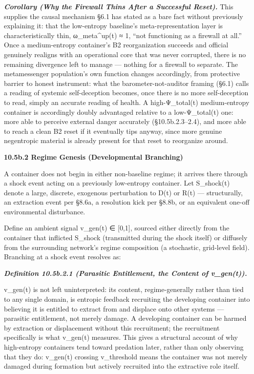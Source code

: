 \documentclass[
]{article}
\begin{document}
\emph{\textbf{Corollary (Why the Firewall Thins After a Successful
Reset).}} This supplies the causal mechanism §6.1 has stated as a bare
fact without previously explaining it: that the low-entropy baseline's
meta-representation layer is characteristically thin, ω\_meta\^{}up(t) ≈
1, ``not functioning as a firewall at all.'' Once a medium-entropy
container's B2 reorganization succeeds and official genuinely realigns
with an operational core that was never corrupted, there is no remaining
divergence left to manage --- nothing for a firewall to separate. The
metamessenger population's own function changes accordingly, from
protective barrier to honest instrument: what the barometer-not-auditor
framing (§6.1) calls a reading of systemic self-deception becomes, once
there is no more self-deception to read, simply an accurate reading of
health. A high-Ψ\_total(t) medium-entropy container is accordingly
doubly advantaged relative to a low-Ψ\_total(t) one: more able to
perceive external danger accurately (§10.5b.2.3--2.4), and more able to
reach a clean B2 reset if it eventually tips anyway, since more genuine
negentropic material is already present for that reset to reorganize
around.

\textbf{10.5b.2 Regime Genesis (Developmental Branching)}

A container does not begin in either non-baseline regime; it arrives
there through a shock event acting on a previously low-entropy
container. Let S\_shock(t) denote a large, discrete, exogenous
perturbation to D(t) or R(t) --- structurally, an extraction event per
§8.6a, a resolution kick per §8.8b, or an equivalent one-off
environmental disturbance.

Define an ambient signal v\_gen(t) ∈ {[}0,1{]}, sourced either directly
from the container that inflicted S\_shock (transmitted during the shock
itself) or diffusely from the surrounding network's regime composition
(a stochastic, grid-level field). Branching at a shock event resolves
as:

\emph{\textbf{Definition 10.5b.2.1 (Parasitic Entitlement, the Content
of v\_gen(t)).}}

v\_gen(t) is not left uninterpreted: its content, regime-generally
rather than tied to any single domain, is entropic feedback recruiting
the developing container into believing it is entitled to extract from
and displace onto other systems --- parasitic entitlement, not merely
damage. A developing container can be harmed by extraction or
displacement without this recruitment; the recruitment specifically is
what v\_gen(t) measures. This gives a structural account of why
high-entropy containers tend toward predation later, rather than only
observing that they do: v\_gen(t) crossing v\_threshold means the
container was not merely damaged during formation but actively recruited
into the extractive role itself.
\end{document}
